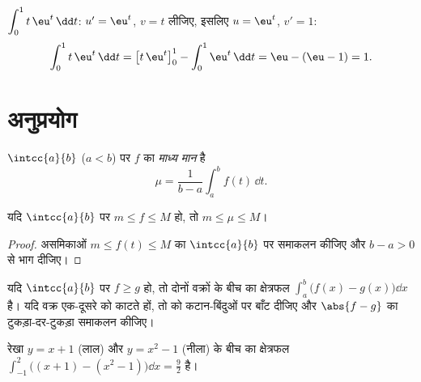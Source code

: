 \begin{example}\label{ex:g12:integ:ibp}
$\displaystyle\int_0^1 t\,\eu^{t}\,\dd t$: $u' = \eu^t$, $v = t$ लीजिए, इसलिए $u = \eu^t$, $v' = 1$:
\[
\int_0^1 t\,\eu^t\,\dd t = \bigl[t\,\eu^t\bigr]_0^1 - \int_0^1 \eu^t\,\dd t
= \eu - (\eu - 1) = 1 .
\]
\end{example}

\section{अनुप्रयोग}

\begin{definition}[माध्य मान]\label{def:g12:integ:mean}
$\intcc{a}{b}$ ($a<b$) पर   $f$ का \emph{माध्य मान} है
\[
\mu = \frac{1}{b-a}\int_a^b f(t)\,\dd t .
\]
\end{definition}

\begin{proposition}\label{prop:g12:integ:meanbounds}
यदि $\intcc{a}{b}$ पर $m \leq f \leq M$ हो, तो $m \leq \mu \leq M$।
\end{proposition}

\begin{proof}
असमिकाओं $m \leq f(t) \leq M$ का $\intcc{a}{b}$ पर समाकलन कीजिए और $b - a > 0$ से भाग दीजिए।
\end{proof}

\begin{method}[दो वक्रों के बीच का क्षेत्रफल]\label{met:g12:integ:areabetween}
यदि $\intcc{a}{b}$ पर $f \geq g$ हो, तो दोनों वक्रों के बीच का क्षेत्रफल $\int_a^b \bigl(f(x) - g(x)\bigr)\dd x$ है। यदि
वक्र एक-दूसरे को काटते हों, तो  को कटान-बिंदुओं पर बाँट दीजिए और $\abs{f - g}$
का टुकड़ा-दर-टुकड़ा समाकलन कीजिए।
\end{method}

\begin{omfigure}

{\small रेखा $y = x + 1$ (लाल) और  $y = x^2 - 1$ (नीला) के बीच का क्षेत्रफल $\int_{-1}^{2}
\bigl((x+1) - (x^2-1)\bigr)\dd x = \frac92$
है।}
\end{omfigure}

